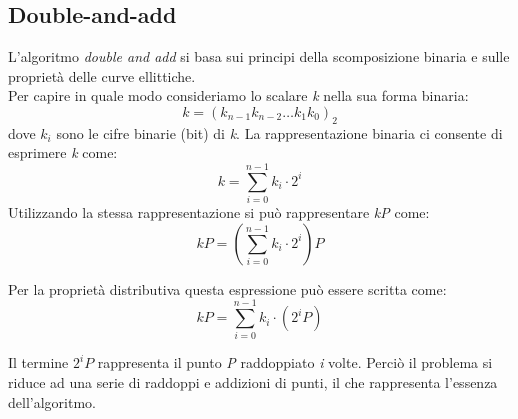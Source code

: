 \documentclass[12pt, a4paper]{report}
\begin{document}
\subsection{Double-and-add}
L'algoritmo \textit{double and add} si basa sui principi della scomposizione binaria e sulle proprietà delle curve ellittiche.
\\Per capire in quale modo consideriamo lo scalare \textit{k} nella sua forma binaria:
\begin{equation}
    k = (k_{n-1}k_{n-2}\dots k_1k_0)_2
\end{equation}
dove $k_i$ sono le cifre binarie (bit) di \textit{k}. La rappresentazione binaria ci consente di esprimere \textit{k} come:
\begin{equation}
    k = \sum_{i=0}^{n-1}k_i \cdot 2^i
\end{equation}
Utilizzando la stessa rappresentazione si può rappresentare \textit{kP} come:
\begin{equation}
    kP = \left(\sum_{i=0}^{n-1}k_i\cdot2^i\right)P
\end{equation}

Per la proprietà distributiva questa espressione può essere scritta come:
\begin{equation}
    kP = \sum_{i=0}^{n-1}k_i \cdot (2^iP)
\end{equation}

Il termine $2^iP$ rappresenta il punto \textit{P} raddoppiato \textit{i} volte. Perciò il problema si riduce ad una serie di raddoppi e addizioni di punti, il che rappresenta l'essenza dell'algoritmo.
\end{document}
